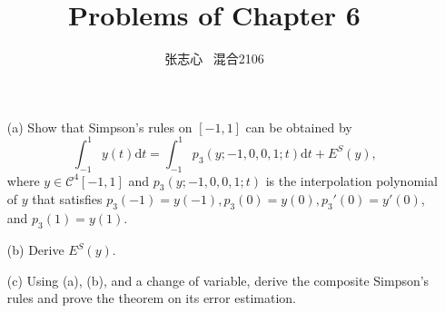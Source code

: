 \documentclass[lang=cn,a4paper,newtx,bibend=bibtex]{elegantpaper}
\title{Problems of Chapter 6}
\author{张志心 \ 混合2106}
\date{\zhdate{2023/12/28}}
\newcommand{\dd}{\mathrm{d}}
\newcommand{\CM}{\mathcal{C}}
\begin{document}
\maketitle

\begin{prob}
\begin{enumerate}
  \item[(a)] Show that Simpson's rules on $[-1, 1]$ can be obtained by 
  \[\int_{-1}^1 y(t)\dd t = \int_{-1}^1 p_3(y; -1, 0, 0, 1; t)\dd t + E^S(y),\]
  where $y \in \CM^4[-1, 1]$ and $p_3(y; -1, 0, 0, 1; t)$ is the interpolation
  polynomial of $y$ that satisfies $p_3(-1) = y(-1), p_3(0) = y(0), p_3\prime(0) = y\prime(0)$,
  and $p_3(1) = y(1)$.
  \item[(b)] Derive $E^S(y)$.
  \item[(c)] Using (a), (b), and a change of variable, derive the
  composite Simpson's rules and prove the theorem on its error estimation.  
\end{enumerate}
\end{prob}
\end{document}
